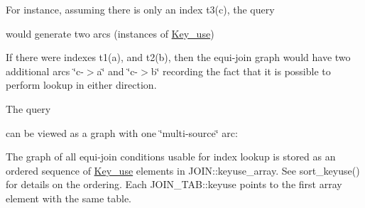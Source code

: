 For instance, assuming there is only an index t3(c), the query


\begin{DoxyCode}{0}
\end{DoxyCode}


would generate two arcs (instances of \mbox{\hyperlink{classKey__use}{Key\+\_\+use}})


\begin{DoxyCode}{0}
\DoxyCodeLine{               |}
\DoxyCodeLine{               \string^}
\DoxyCodeLine{               |}
\end{DoxyCode}


If there were indexes t1(a), and t2(b), then the equi-\/join graph would have two additional arcs \char`\"{}c-\/$>$a\char`\"{} and \char`\"{}c-\/$>$b\char`\"{} recording the fact that it is possible to perform lookup in either direction.


\begin{DoxyCode}{0}
\DoxyCodeLine{ \string^             |    |               \string^}
\DoxyCodeLine{ |             |    |               |}
\DoxyCodeLine{\textcolor{stringliteral}{                 t3}}
\end{DoxyCode}


The query


\begin{DoxyCode}{0}
\end{DoxyCode}


can be viewed as a graph with one \char`\"{}multi-\/source\char`\"{} arc\+:


\begin{DoxyCode}{0}
\DoxyCodeLine{          |}
\DoxyCodeLine{          |}
\end{DoxyCode}


The graph of all equi-\/join conditions usable for index lookup is stored as an ordered sequence of \mbox{\hyperlink{classKey__use}{Key\+\_\+use}} elements in J\+O\+I\+N\+::keyuse\+\_\+array. See sort\+\_\+keyuse() for details on the ordering. Each J\+O\+I\+N\+\_\+\+T\+A\+B\+::keyuse points to the first array element with the same table. 

